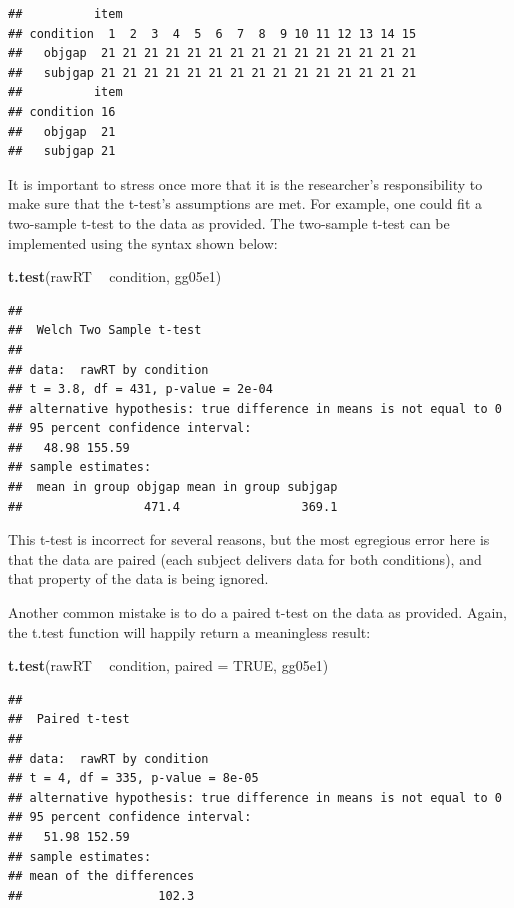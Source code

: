 \documentclass[12pt,]{krantz}
\newenvironment{Shaded}{\begin{snugshade}}{\end{snugshade}}
\newcommand{\DataTypeTok}[1]{\textcolor[rgb]{0.13,0.29,0.53}{#1}}
\newcommand{\KeywordTok}[1]{\textcolor[rgb]{0.13,0.29,0.53}{\textbf{#1}}}
\newcommand{\NormalTok}[1]{#1}
\newcommand{\OperatorTok}[1]{\textcolor[rgb]{0.81,0.36,0.00}{\textbf{#1}}}
\newcommand{\OtherTok}[1]{\textcolor[rgb]{0.56,0.35,0.01}{#1}}
\newcommand{\StringTok}[1]{\textcolor[rgb]{0.31,0.60,0.02}{#1}}
\begin{document}
\begin{verbatim}
##          item
## condition  1  2  3  4  5  6  7  8  9 10 11 12 13 14 15
##   objgap  21 21 21 21 21 21 21 21 21 21 21 21 21 21 21
##   subjgap 21 21 21 21 21 21 21 21 21 21 21 21 21 21 21
##          item
## condition 16
##   objgap  21
##   subjgap 21
\end{verbatim}

It is important to stress once more that it is the researcher's responsibility to make sure that the t-test's assumptions are met. For example, one could fit a two-sample t-test to the data as provided. The two-sample t-test can be implemented using the syntax shown below:

\begin{Shaded}
\begin{Highlighting}[]
\KeywordTok{t.test}\NormalTok{(rawRT }\OperatorTok{~}\StringTok{ }\NormalTok{condition, gg05e1)}
\end{Highlighting}
\end{Shaded}

\begin{verbatim}
## 
## 	Welch Two Sample t-test
## 
## data:  rawRT by condition
## t = 3.8, df = 431, p-value = 2e-04
## alternative hypothesis: true difference in means is not equal to 0
## 95 percent confidence interval:
##   48.98 155.59
## sample estimates:
##  mean in group objgap mean in group subjgap 
##                 471.4                 369.1
\end{verbatim}

This t-test is incorrect for several reasons, but the most egregious error here is that the data are paired (each subject delivers data for both conditions), and that property of the data is being ignored.

Another common mistake is to do a paired t-test on the data as provided. Again, the t.test function will happily return a meaningless result:

\begin{Shaded}
\begin{Highlighting}[]
\KeywordTok{t.test}\NormalTok{(rawRT }\OperatorTok{~}\StringTok{ }\NormalTok{condition, }\DataTypeTok{paired =} \OtherTok{TRUE}\NormalTok{, gg05e1)}
\end{Highlighting}
\end{Shaded}

\begin{verbatim}
## 
## 	Paired t-test
## 
## data:  rawRT by condition
## t = 4, df = 335, p-value = 8e-05
## alternative hypothesis: true difference in means is not equal to 0
## 95 percent confidence interval:
##   51.98 152.59
## sample estimates:
## mean of the differences 
##                   102.3
\end{verbatim}
\end{document}
